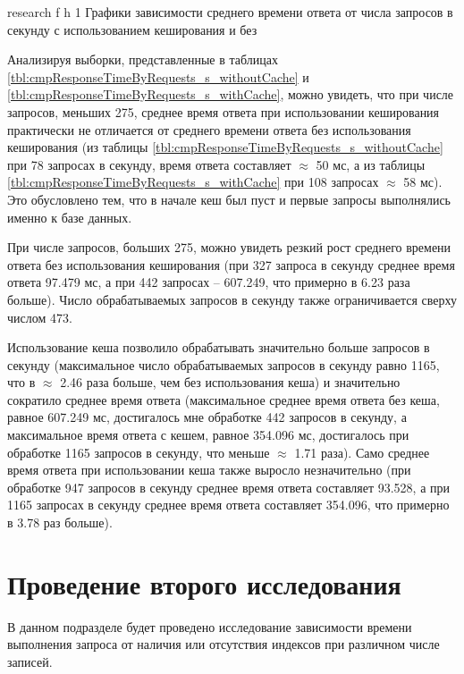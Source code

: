 {research} %
{f} %
{h} %
{1\textwidth} %
{Графики зависимости среднего времени ответа от числа запросов в секунду с использованием кеширования и без} %

Анализируя выборки, представленные в таблицах \ref{tbl:cmpResponseTimeByRequests_s_withoutCache} и \ref{tbl:cmpResponseTimeByRequests_s_withCache}, можно увидеть, что при числе запросов, меньших 275, среднее время ответа при использовании кеширования практически не отличается от среднего времени ответа без использования кеширования (из таблицы \ref{tbl:cmpResponseTimeByRequests_s_withoutCache} при 78 запросах в секунду, время ответа составляет $\approx$ 50 мс, а из таблицы \ref{tbl:cmpResponseTimeByRequests_s_withCache} при 108 запросах $\approx$ 58 мс). Это обусловлено тем, что в начале кеш был пуст и первые запросы выполнялись именно к базе данных.

При числе запросов, больших 275, можно увидеть резкий рост среднего времени ответа без использования кеширования (при 327 запроса в секунду среднее время ответа 97.479 мс, а при 442 запросах -- 607.249, что примерно в 6.23 раза больше). Число обрабатываемых запросов в секунду также ограничивается сверху числом 473.

Использование кеша позволило обрабатывать значительно больше запросов в секунду (максимальное число обрабатываемых запросов в секунду равно 1165, что в $\approx$ 2.46 раза больше, чем без использования кеша) и значительно сократило среднее время ответа (максимальное среднее время ответа без кеша, равное 607.249 мс, достигалось мне обработке 442 запросов в секунду, а максимальное время ответа с кешем, равное 354.096 мс, достигалось при обработке 1165 запросов в секунду, что меньше $\approx$ 1.71 раза). Само среднее время ответа при использовании кеша также выросло незначительно (при  обработке 947 запросов в секунду среднее время ответа составляет 93.528, а при 1165 запросах в секунду среднее время ответа составляет 354.096, что примерно  в 3.78 раз больше).

\section{Проведение второго исследования}

В данном подразделе будет проведено исследование зависимости времени выполнения запроса от наличия или отсутствия индексов при различном числе записей.

